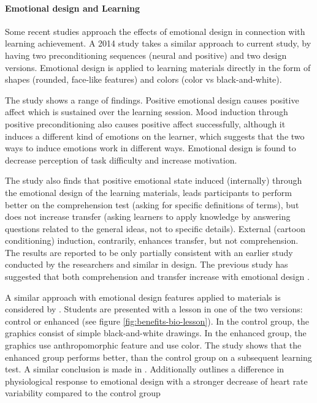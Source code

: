 		\paragraph{Emotional design and Learning} 
		
		Some recent studies approach the effects of emotional design in connection with learning achievement. A 2014 study takes a similar approach to current study, by having two preconditioning sequences (neural and positive) and two design versions. Emotional design is applied to learning materials directly in the form of shapes (rounded, face-like features) and colors (color vs black-and-white).
		
		The study shows a range of findings. Positive emotional design causes positive affect which is sustained over the learning session. Mood induction through positive preconditioning also causes positive affect successfully, although it induces a different kind of emotions on the learner, which suggests that the two ways to induce emotions work in different ways. 
		Emotional design is found to decrease perception of task difficulty and increase motivation.
		
		The study also finds that positive emotional state induced (internally) through the emotional design of the learning materials, leads participants to perform better on the comprehension test (asking for specific definitions of terms), but does not increase transfer (asking learners to apply knowledge by answering questions related to the general ideas, not to specific details). External (cartoon conditioning) induction, contrarily, enhances transfer, but not comprehension.
		The results are reported to be only partially consistent with an earlier study conducted by the researchers and similar in design. The previous study has suggested that both comprehension and transfer increase with emotional design \cite{Plass2014, Plass2016}.
		
		A similar approach with emotional design features applied to materials is considered by \cite{Mayer2014}. Students are presented with a lesson in one of the two versions: control or enhanced (see figure \ref{fig:benefits-bio-lesson}). In the control group, the graphics consist of simple black-and-white drawings. In the enhanced group, the graphics use anthropomorphic feature and use color. The study shows that the enhanced group performs better, than the control group on a subsequent learning test. A similar conclusion is made in \cite{Le2018}. Additionally \cite{Le2018} outlines a difference in physiological response to emotional design with a stronger decrease of heart rate variability compared to the control group
		

